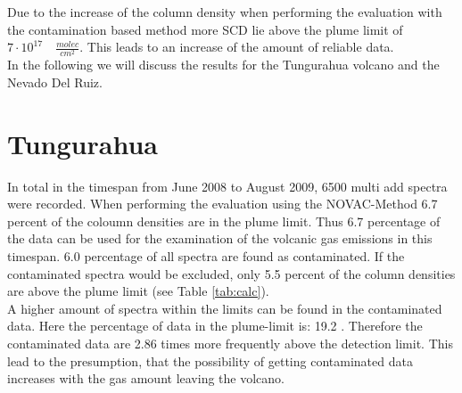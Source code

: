 \documentclass  [
  paper    = a4,
  BCOR     = 10mm,
  twoside,
  fontsize = 12pt,
  fleqn,
  toc      = bibnumbered,
  toc      = listofnumbered,
  numbers  = noendperiod,
  headings = normal,
  listof   = leveldown,
  version  = 3.03
]                                       {scrreprt}
\begin{document}
Due to the increase of the   column density when performing the evaluation with the contamination based method more   SCD lie above the plume limit of $7\cdot10^{17}\quad \frac{molec}{cm^2}$. This leads to an increase of the amount of reliable data.\\ 
In the following we will discuss the results for the Tungurahua volcano and the Nevado Del Ruiz. 



\section{Tungurahua}
 	In total in the timespan from June 2008 to August 2009, 6500 multi add spectra were recorded. 
 	When performing the evaluation using the NOVAC-Method 6.7 percent of the   coloumn densities are in the plume limit. Thus 6.7 percentage of the data can be used for the examination of the volcanic gas emissions in this timespan.
 	6.0 percentage of all spectra are found as contaminated. If the contaminated spectra would be excluded, only 5.5 percent of the   column densities are above the plume limit  (see  Table \ref{tab:calc}). \\
 	A higher amount of spectra within the   limits can be found in the contaminated data. Here the percentage of data in the plume-limit is: 19.2 .
 	Therefore the contaminated data are 2.86 times more frequently above the detection limit. This lead to the presumption, that the possibility of getting contaminated data increases with the gas amount leaving the volcano.
 	
\end{document}
